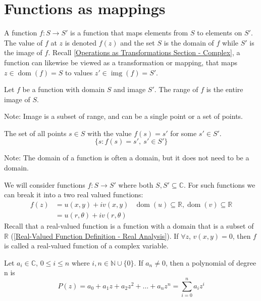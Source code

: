 \documentclass[12pt, english]{book}
\begin{document}
	\section{Functions as mappings} \label{Functions as Mappings Section - Complex}
	A function $f: S \rightarrow S'$ is a function that maps elements from $S$ to elements on $S'$. The value of $f$ at $z$ is denoted $f(z)$ and the set $S$ is the domain of $f$ while $S'$ is the image of $f$. Recall \cref{Operations as Transformations Section - Complex}, a function can likewise be viewed as a transformation or mapping, that maps $z \in \operatorname{dom}(f) = S$ to values $z' \in \operatorname{img}(f) = S'$.
	
	\begin{definition}[Range] 
		Let $f$ be a function with domain $S$ and image $S'$. The range of $f$ is the entire image of $S$.
	\end{definition}

	Note: Image is a subset of range, and can be a single point or a set of points.

	\begin{definition} 
		The set of all points $s \in S$ with the value $f(s) = s'$ for some $s' \in S'$.
		$$\{s : f(s) = s', \ s' \in S'\}$$
	\end{definition}
	
	Note: The domain of a function is often a domain, but it does not need to be a domain. 
	
	We will consider functions $f: S \rightarrow S'$ where both $S, S' \subseteq \mathbb{C}$. For such functions we can break it into a two real valued functions: 
	\begin{align*}
		f(z) &= u(x, y) + i v(x, y)
			& \operatorname{dom}(u) \subseteq \mathbb{R}, \operatorname{dom}(v) \subseteq \mathbb{R} \\
			&= u(r, \theta) + i v(r, \theta)
	\end{align*}
	Recall that a real-valued function is a function with a domain that is a subset of $\mathbb{R}$ (\cref{Real-Valued Function Definition - Real Analysis}).
	If $\forall z$, $v(x, y) = 0$, then $f$ is called a real-valued function of a complex variable. 
	
	\begin{definition}[Polynomial] 
		\label{Polynomial Definition - Complex}
		Let $a_i \in \mathbb{C}$, $0 \leq i \leq n$ where $i, n \in \mathbb{N}\cup\{0\}$. If $a_n \neq 0$, then a polynomial of degree n is
		$$P(z) = a_0 + a_1 z + a_2 z^2 + \ldots + a_n z^n = \sum_{i=0}^n a_i z^i$$
	\end{definition}
\end{document}
